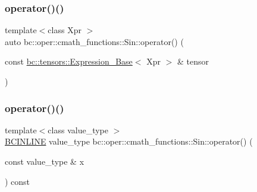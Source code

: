 \mbox{\label{structbc_1_1oper_1_1cmath__functions_1_1Sin_acfc4f7388c0b3709c8d8bffa82b79921}} 
\subsubsection{\texorpdfstring{operator()()}{operator()()}\hspace{0.1cm}{\footnotesize\ttfamily [2/3]}}
{\footnotesize\ttfamily template$<$class Xpr $>$ \\
auto bc\+::oper\+::cmath\+\_\+functions\+::\+Sin\+::operator() (\begin{DoxyParamCaption}\item[{const \hyperlink{classbc_1_1tensors_1_1Expression__Base}{bc\+::tensors\+::\+Expression\+\_\+\+Base}$<$ Xpr $>$ \&}]{tensor }\end{DoxyParamCaption})\hspace{0.3cm}{\ttfamily [inline]}}

\mbox{\label{structbc_1_1oper_1_1cmath__functions_1_1Sin_a1e130441b55a6ac62f462f8a5d398fe3}} 
\subsubsection{\texorpdfstring{operator()()}{operator()()}\hspace{0.1cm}{\footnotesize\ttfamily [3/3]}}
{\footnotesize\ttfamily template$<$class value\+\_\+type $>$ \\
\hyperlink{common_8h_a6699e8b0449da5c0fafb878e59c1d4b1}{B\+C\+I\+N\+L\+I\+NE} value\+\_\+type bc\+::oper\+::cmath\+\_\+functions\+::\+Sin\+::operator() (\begin{DoxyParamCaption}\item[{const value\+\_\+type \&}]{x }\end{DoxyParamCaption}) const\hspace{0.3cm}{\ttfamily [inline]}}



